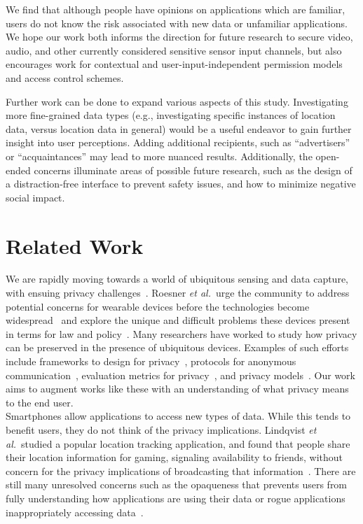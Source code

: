 \documentclass{sig-alternate-hotpets15}
\begin{document}
We find that although people have opinions on applications which are familiar, users do not know the risk associated with new data or unfamiliar applications. We hope our work both informs the direction for future research to secure video, audio, and other currently considered sensitive sensor input channels, but also encourages work for contextual and user-input-independent permission models and access control schemes.

Further work can be done to expand various aspects of this study. Investigating more fine-grained data types (e.g., investigating specific instances of location data, versus location data in general) would be a useful endeavor to gain further insight into user perceptions. Adding additional recipients, such as ``advertisers'' or ``acquaintances'' may lead to more nuanced results. Additionally, the open-ended concerns illuminate areas of possible future research, such as the design of a distraction-free interface to prevent safety issues, and how to minimize negative social impact. 

\section{Related Work}
 We are rapidly moving towards a world of ubiquitous sensing and data capture, with ensuing privacy challenges~\cite{abowd2000charting,palen2003unpacking,camp2000internet}. Roesner {\it et al.}\ urge the community to address potential concerns for wearable devices before the technologies become widespread~\cite{roesner2014security} and explore the unique and difficult problems these devices present in terms for law and policy~\cite{roesner2014augmented}. Many researchers have worked to study how privacy can be preserved in the presence of ubiquitous devices. Examples of such efforts include frameworks to design for privacy~\cite{bellotti1993design,camp2003designing,langheinrich2001privacy}, protocols for anonymous communication~\cite{cornelius2008anonysense}, evaluation metrics for privacy~\cite{scholtz2004toward}, and privacy models~\cite{hong2004privacy, jiang2002approximate}. Our work aims to augment works like these with an understanding of what privacy means to the end user. \\

 Smartphones allow applications to access new types of data. While this tends to benefit users, they do not think of the privacy implications. Lindqvist {\it et al.}\  studied a popular location tracking application, and found that people share their location information for gaming, signaling availability to friends, without concern for the privacy implications of broadcasting that information~\cite{lindqvist2011m}. There are still many unresolved concerns such as the opaqueness that prevents users from fully understanding how applications are using their data or rogue applications inappropriately accessing data~\cite{1_kane_2010, zhou2011taming}.
\end{document}

